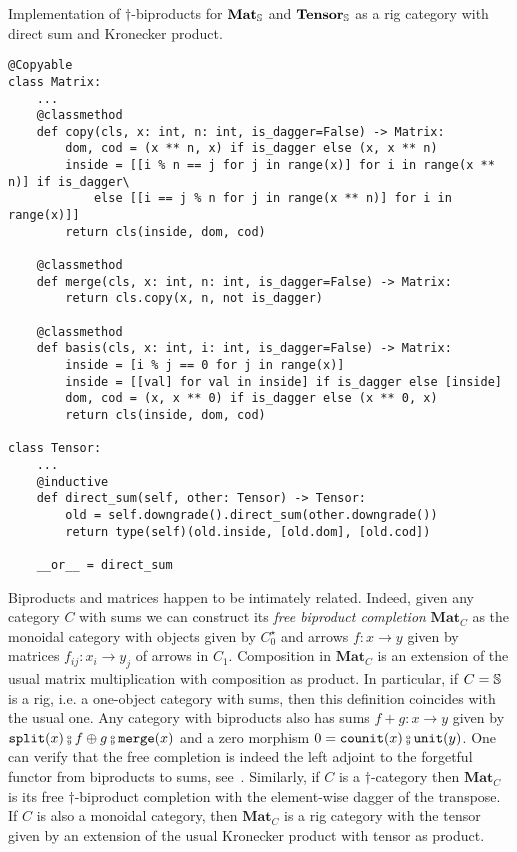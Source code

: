 \begin{python}
{\normalfont Implementation of $\dagger$-biproducts for $\mathbf{Mat}_\S$
and $\mathbf{Tensor}_\S$ as a rig category with direct sum and Kronecker product.}

\begin{verbatim}
@Copyable
class Matrix:
    ...
    @classmethod
    def copy(cls, x: int, n: int, is_dagger=False) -> Matrix:
        dom, cod = (x ** n, x) if is_dagger else (x, x ** n)
        inside = [[i % n == j for j in range(x)] for i in range(x ** n)] if is_dagger\
            else [[i == j % n for j in range(x ** n)] for i in range(x)]]
        return cls(inside, dom, cod)

    @classmethod
    def merge(cls, x: int, n: int, is_dagger=False) -> Matrix:
        return cls.copy(x, n, not is_dagger)

    @classmethod
    def basis(cls, x: int, i: int, is_dagger=False) -> Matrix:
        inside = [i % j == 0 for j in range(x)]
        inside = [[val] for val in inside] if is_dagger else [inside]
        dom, cod = (x, x ** 0) if is_dagger else (x ** 0, x)
        return cls(inside, dom, cod)

class Tensor:
    ...
    @inductive
    def direct_sum(self, other: Tensor) -> Tensor:
        old = self.downgrade().direct_sum(other.downgrade())
        return type(self)(old.inside, [old.dom], [old.cod])

    __or__ = direct_sum
\end{verbatim}
\end{python}

Biproducts and matrices happen to be intimately related.
Indeed, given any category $C$ with sums we can construct its \emph{free biproduct completion} $\mathbf{Mat}_C$ as the monoidal category with objects given by $C_0^\star$ and arrows $f : x \to y$ given by matrices $f_{ij} : x_i \to y_j$ of arrows in $C_1$.
Composition in $\mathbf{Mat}_C$ is an extension of the usual matrix multiplication with composition as product.
In particular, if $C = \S$ is a rig, i.e. a one-object category with sums, then this definition coincides with the usual one.
Any category with biproducts also has sums $f + g : x \to y$ given by $\ttsplit(x) \fcmp f \oplus g \fcmp \merge(x)$ and a zero morphism $0 = \counit(x) \fcmp \unit(y)$.
One can verify that the free completion is indeed the left adjoint to the forgetful functor from biproducts to sums, see~\cite[Exercise VIII.2.6]{MacLane71}.
Similarly, if $C$ is a $\dagger$-category then $\mathbf{Mat}_C$ is its free $\dagger$-biproduct completion with the element-wise dagger of the transpose.
If $C$ is also a monoidal category, then $\mathbf{Mat}_C$ is a rig category with the tensor given by an extension of the usual Kronecker product with tensor as product.

